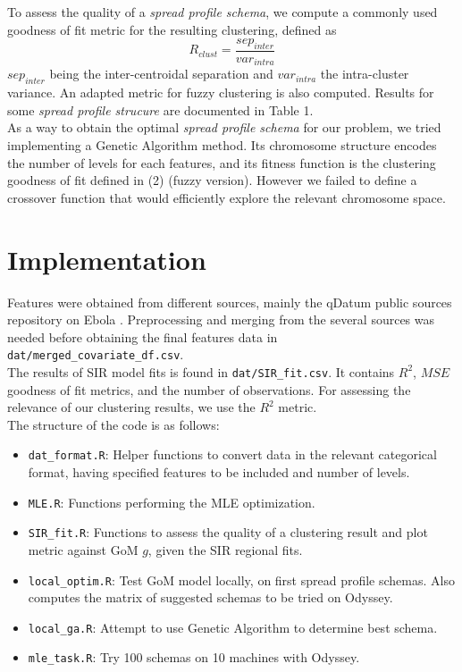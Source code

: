 \documentclass[twoside]{article}
\begin{document}
To assess the quality of a \textit{spread profile schema}, we compute a commonly used goodness of fit metric for the resulting clustering, defined as
\begin{equation}
R_{clust} = \frac{sep_{inter}}{var_{intra}}
\end{equation}
$sep_{inter}$ being the inter-centroidal separation and $var_{intra}$ the intra-cluster variance. An adapted metric for fuzzy clustering is also computed. Results for some \textit{spread profile strucure} are documented in Table 1.\\

As a way to obtain the optimal \textit{spread profile schema} for our problem, we tried implementing a Genetic Algorithm method. Its chromosome structure encodes the number of levels for each features, and its fitness function is the clustering goodness of fit defined in (2) (fuzzy version). However we failed to define a crossover function that would efficiently explore the relevant chromosome space.

\section{Implementation}

Features were obtained from different sources, mainly the qDatum public sources repository on Ebola \cite{source}. Preprocessing and merging from the several sources was needed before obtaining the final features data in \texttt{dat/merged\_covariate\_df.csv}.\\
\indent
The results of SIR model fits is found in \texttt{dat/SIR\_fit.csv}. It contains $R^2$, $MSE$ goodness of fit metrics, and the number of observations. For assessing the relevance of our clustering results, we use the $R^2$ metric.\\

The structure of the code is as follows:
\begin{itemize}
\item \texttt{dat\_format.R}: Helper functions to convert data in the relevant categorical format, having specified features to be included and number of levels.
\item \texttt{MLE.R}: Functions performing the MLE optimization.
\item \texttt{SIR\_fit.R}: Functions to assess the quality of a clustering result and plot metric against GoM $g$, given the SIR regional fits.
\item \texttt{local\_optim.R}: Test GoM model locally, on first spread profile schemas. Also computes the matrix of suggested schemas to be tried on Odyssey.
\item \texttt{local\_ga.R}: Attempt to use Genetic Algorithm to determine best schema.
\item \texttt{mle\_task.R}: Try 100 schemas on 10 machines with Odyssey.
\end{itemize}
\end{document}
